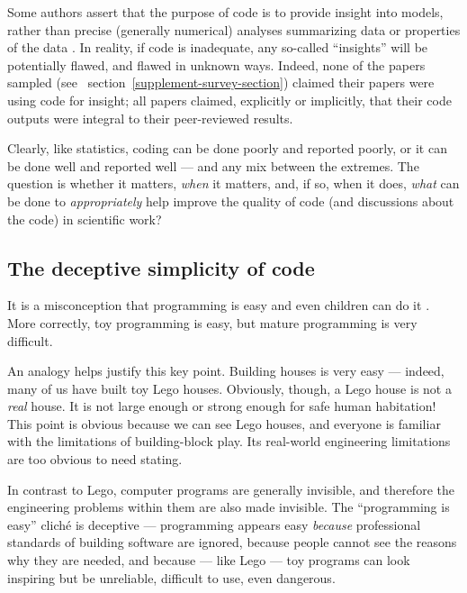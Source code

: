 \documentclass{comjnl}
\begin{document}
Some authors assert that the purpose of code is to provide insight into models, rather than precise (generally numerical) analyses summarizing data or properties of the data \cite{assessing-quality}. In reality, if code is inadequate, any so-called ``insights'' will be potentially flawed, and flawed in unknown ways. Indeed, none of the papers sampled (see \supplement\ section~\ref{supplement-survey-section}) claimed their papers were using code for insight; all papers claimed, explicitly or implicitly, that their code outputs were integral to their peer-reviewed results.

Clearly, like statistics, coding can be done poorly and reported poorly, or it can be done well and reported well --- and any mix between the extremes. The question is whether it matters, \emph{when\/} it matters, and, if so, when it does, \emph{what\/} can be done to \emph{appropriately\/} help improve the quality of code (and discussions about the code) in scientific work?

\subsection{The deceptive simplicity of code}\label{deceptive-simplicity-of-code}
It is a misconception that programming is easy and even children can do it \cite{fixit}. More correctly, toy programming is easy, but mature programming is very difficult. %

An analogy helps justify this key point. Building houses is very easy --- indeed, many of us have built toy Lego houses. Obviously, though, a Lego house is not a \emph{real\/} house. It is not large enough or strong enough for safe human habitation! This point is obvious because we can see Lego houses, and everyone is familiar with the limitations of building-block play. Its real-world engineering limitations are too obvious to need stating. 

In contrast to Lego, computer programs are generally invisible, and therefore the engineering problems within them are also made invisible. The ``programming is easy'' clich\' e is deceptive --- programming appears easy \emph{because\/} professional standards of building software are ignored, because people cannot see the reasons why they are needed, and because --- like Lego --- toy programs can look inspiring but be unreliable, difficult to use, even dangerous. 
\end{document}
